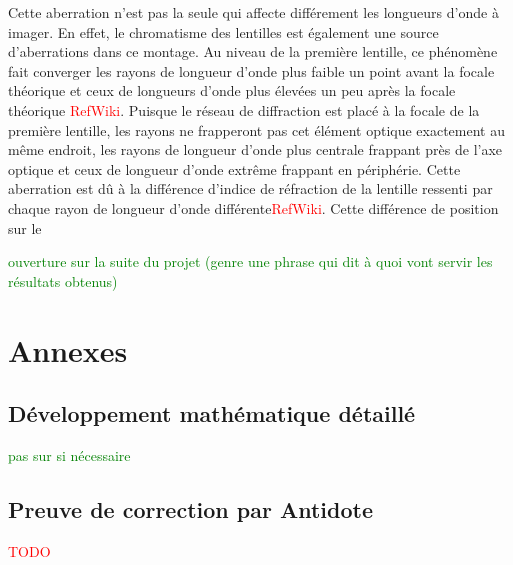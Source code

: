 \documentclass[conference]{IEEEtran}
\begin{document}
Cette aberration n'est pas la seule qui affecte différement les longueurs d'onde à imager. En effet, le chromatisme des lentilles
est également une source d'aberrations dans ce montage. Au niveau de la première lentille, ce phénomène fait converger les rayons 
de longueur d'onde plus faible un point avant la focale théorique et ceux de longueurs d'onde plus élevées un peu après la focale
théorique \textcolor{red}{RefWiki}. Puisque le réseau de diffraction est placé à la focale de la première lentille, les rayons ne
frapperont pas cet élément optique exactement au même endroit, les rayons de longueur d'onde plus centrale frappant près de l'axe
optique et ceux de longueur d'onde extrême frappant en périphérie. Cette aberration est dû à la différence d'indice de réfraction 
de la lentille ressenti par chaque rayon de longueur d'onde différente\textcolor{red}{RefWiki}. Cette différence de position sur le 

\textcolor{green}{ouverture sur la suite du projet (genre une phrase qui dit à quoi vont servir les résultats obtenus)}

\printbibliography

\clearpage

\section{Annexes}

\subsection{Développement mathématique détaillé}
\textcolor{green}{pas sur si nécessaire}

\subsection{Preuve de correction par Antidote}
\textcolor{red}{TODO}


\clearpage
\end{document}
